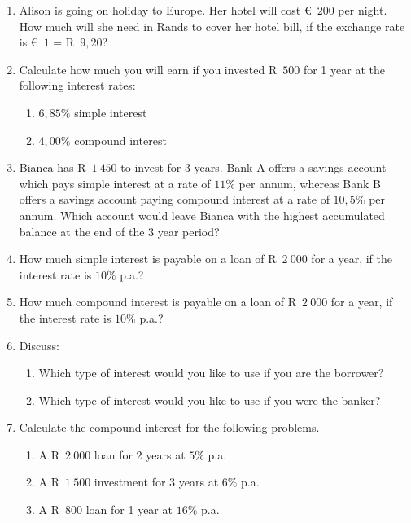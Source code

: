 \begin{eocexercises}{}
    \begin{enumerate}[label=\textbf{\arabic*}.]
	\item Alison is going on holiday to Europe. Her hotel will cost €~$200$ per night. How much will she need in Rands to cover her hotel bill, if the exchange rate is €~$1$ = R~$9,20$?

	\item Calculate how much you will earn if you invested R~$500$ for 1 year at the following interest rates:
	\begin{enumerate}[noitemsep, label=\textbf{(\alph*)} ]
	    \item $6,85\%$ simple interest
	    \item $4,00\%$ compound interest
	\end{enumerate}

	\item Bianca has R~$1~450$ to invest for 3 years. Bank A offers a savings account which pays simple interest at a rate of $11\%$ per annum, whereas Bank B offers a savings account paying compound interest at a rate of $10,5\%$ per annum. Which account would leave Bianca with the highest accumulated balance at the end of the 3 year period?

	\item How much simple interest is payable on a loan of R~$2~000$ for a year, if the interest rate is $10\%$ p.a.?

	\item How much compound interest is payable on a loan of R~$2~000$ for a year, if the interest rate is $10\%$ p.a.?

	\item Discuss:
	\begin{enumerate}[noitemsep, label=\textbf{(\alph*)} ]
	    \item Which type of interest would you like to use if you are the borrower?

	    \item Which type of interest would you like to use if you were the banker?
	\end{enumerate}

	\item Calculate the compound interest for the following problems.
	\begin{enumerate}[noitemsep, label=\textbf{(\alph*)} ]
	    \item A R~$2~000$ loan for 2 years at $5\%$ p.a.
	    \item A R~$1~500$ investment for 3 years at $6\%$ p.a.
	    \item A R~$800$ loan for 1 year at $16\%$ p.a.
	\end{enumerate}


\end{enumerate}
\end{eocexercises}
